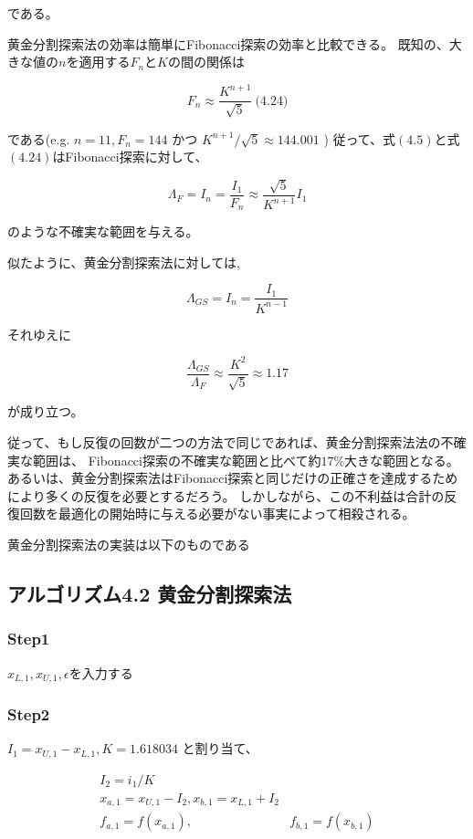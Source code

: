 である。

黄金分割探索法の効率は簡単にFibonacci探索の効率と比較できる。
既知の、大きな値の$n$を適用する$F_n$と$K$の間の関係は

$$F_n \approx
\frac{K^{n+1}}{\sqrt{5}}
\ \text{(4.24)}$$

である(e.g. $n=11, F_n =144$ かつ $K^{n+1} /
\sqrt{5} \approx 144.001$ )
従って、式$(4.5)$と式$(4.24)$はFibonacci探索に対して、

$$ \Lambda_F = I_n =
\frac{I_1}{F_n} \approx
\frac{\sqrt{5}}{K^{n+1}} I_1
$$

のような不確実な範囲を与える。

似たように、黄金分割探索法に対しては,

$$\Lambda_{GS} = I_n =
\frac{I_1}{K^{n-1}}$$

それゆえに

$$
\frac{\Lambda_{GS}}{\Lambda_F}
\approx \frac{K^2}{\sqrt{5}}
\approx 1.17 $$

が成り立つ。

従って、もし反復の回数が二つの方法で同じであれば、黄金分割探索法法の不確実な範囲は、
Fibonacci探索の不確実な範囲と比べて約$17\%$大きな範囲となる。
あるいは、黄金分割探索法はFibonacci探索と同じだけの正確さを達成するためにより多くの反復を必要とするだろう。
しかしながら、この不利益は合計の反復回数を最適化の開始時に与える必要がない事実によって相殺される。

黄金分割探索法の実装は以下のものである

\newpage

\subsection*{アルゴリズム4.2 黄金分割探索法}\label{-4-2-}

\subsubsection*{Step1}\label{step1}

$x_{L,1}, x_{U,1}, \epsilon$を入力する

\subsubsection*{Step2}\label{step2}

$I_1 = x_{U,1} - x_{L,1}, K = 1.618034$ と割り当て、

$$ \begin{array}{ll}I_2 = i_1 / K
\\ x_{a,1} = x_{U,1} - I_2,
x_{b,1} = x_{L,1} + I_2 \\
f_{a,1} = f(x_{a,1}), & f_{b,1} = f(x_{b,1})
\end{array} $$

